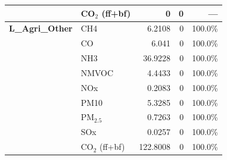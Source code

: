 \begin{longtable}{@{}llrrr@{}}
 & CO$_2$ (ff+bf) & 0 & 0 & --- \\
 \midrule
\addlinespace[2pt]
\textbf{L\_Agri\_Other} & CH4 & 6.2108 & 0 & 100.0\% \\
 & CO & 6.041 & 0 & 100.0\% \\
 & NH3 & 36.9228 & 0 & 100.0\% \\
 & NMVOC & 4.4433 & 0 & 100.0\% \\
 & NOx & 0.2083 & 0 & 100.0\% \\
 & PM10 & 5.3285 & 0 & 100.0\% \\
 & PM$_{2.5}$ & 0.7263 & 0 & 100.0\% \\
 & SOx & 0.0257 & 0 & 100.0\% \\
 & CO$_2$ (ff+bf) & 122.8008 & 0 & 100.0\% \\
\end{longtable}
\endgroup
